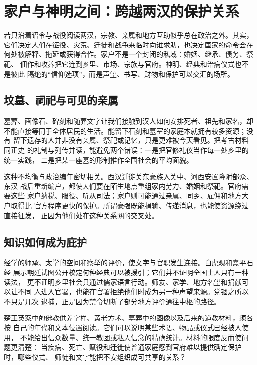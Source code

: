 \section{家户与神明之间：跨越两汉的保护关系}
\label{sec:han-households-religion-longue}

若只沿着诏令与战役阅读两汉，宗教、亲属和地方互助似乎总在政治之外。其实，
它们决定人们在征役、灾荒、迁徙和战争来临时向谁求助，也决定国家的命令会在
何处被解释、拖延或获得合作。家户不是一个封闭的私域：婚姻、继承、债务、祭祀、
佃作和收养把它连到乡里、市场、宗族与官府。神明、经典和治病仪式也不是彼此
隔绝的“信仰选项”，而是声望、书写、财物和保护可以交汇的场所。

\subsection{坟墓、祠祀与可见的亲属}

墓葬、画像石、碑刻和随葬文字让我们接触到汉人如何安排死者、祖先和家名，却
不能直接等同于全体居民的生活。能留下石刻和墓室的家庭本就拥有较多资源；没有
留下遗存的人并非没有亲属、祭祀或记忆，只是更难被今天看见。把考古材料同正史
的礼制与列传并读，能避免两个错误：一是把官修礼仪当作每一处乡里的统一实践，
二是把某一座墓的形制推作全国社会的平均面貌。

这种不均衡与政治编年密切相关。西汉迁徙关东豪族入关中、河西安置降附部众、东汉
战后重新编户，都使人们要在陌生地点重组家内劳力、婚姻和祭祀。官府需要这些
家户纳税、服役、听从司法；家户则可能通过亲属、同乡、雇佣和地方大户取得比
官方程序更快的保护。所谓豪强既能捐输、传递消息，也能使资源绕过直接征发，
正因为他们处在这种关系网的交叉处。

\subsection{知识如何成为庇护}

经学的师承、太学的空间和察举的评价，使文字与官职发生连接。白虎观和熹平石经
展示朝廷试图公开校定何种经典可以被援引；它们并不证明全国士人只有一种读法，
更不证明乡里社会只通过儒家语言行动。师友、家学、地方名望和捐献可以让不同
人进入官署，也能在官署拒绝他们时成为另一种声望来源。党锢之所以不只是几次
逮捕，正是因为禁令切断了部分地方评价通往中枢的路径。

楚王英案中的佛教供养字样、黄老方术、墓葬中的图像以及后来的道教材料，须各按
自己的年代和文本位置阅读。它们可以说明某些术语、物品或仪式已经被人使用，
不能给出信众数量、统一教团或私人信念的精确统计。材料的限度反而使问题更清楚：
当疾病、死亡、赋役和迁徙使普通家庭感到官府难以提供确定保护时，哪些仪式、
师徒和文字能把不安组织成可共享的关系？

